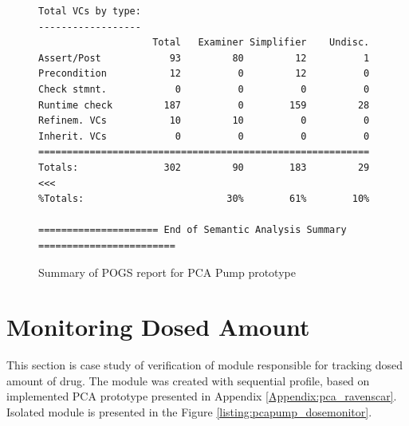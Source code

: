 \begin{figure}
\begin{lstlisting}[frame=single, gobble=0]
Total VCs by type:
------------------
                    Total   Examiner Simplifier    Undisc.
Assert/Post            93         80         12          1
Precondition           12          0         12          0
Check stmnt.            0          0          0          0
Runtime check         187          0        159         28
Refinem. VCs           10         10          0          0
Inherit. VCs            0          0          0          0
==========================================================
Totals:               302         90        183         29 <<<
%Totals:                         30%        61%        10%

===================== End of Semantic Analysis Summary ========================
\end{lstlisting}
\doublespacing
\caption{Summary of POGS report for PCA Pump prototype}
\label{listing:pca_ravenscar:pogs}
\end{figure}



\section{Monitoring Dosed Amount}
\label{verification:pcapump:monitoring}

This section is case study of verification of module responsible for tracking dosed amount of drug. The module was created with sequential profile, based on implemented PCA prototype presented in Appendix \ref{Appendix:pca_ravenscar}. Isolated module is presented in the Figure \ref{listing:pcapump_dosemonitor}.


